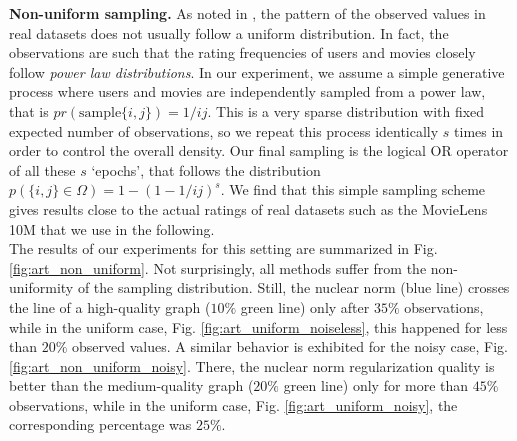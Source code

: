 \documentclass{article}
\begin{document}
{\bf Non-uniform sampling. } 
As noted in \cite{salakhutdinov2010collaborative}, the pattern of the observed values in real datasets does not usually follow a uniform distribution. In fact, the observations are such that the rating frequencies of users and movies closely follow \textit{power law distributions}. 
In our experiment, we assume a simple generative process where users and movies are independently sampled from a power law, that is $pr\left(\textrm{sample} \{i,j\}\right) = 1/ ij$. This is a very sparse distribution with fixed expected number of observations, so we repeat this process identically $s$ times in order to control the overall density. Our final sampling is the logical OR operator of all these $s$ `epochs', that follows the distribution
$p\left(\{i,j\} \in \Omega\right) = 1 - \left(1 - 1/ij\right)^s. $
We find that this simple sampling scheme gives results close to the actual ratings of real datasets such as the MovieLens 10M that we use in the following.\\
The results of our experiments for this setting are summarized in Fig. \ref{fig:art_non_uniform}. Not surprisingly, all methods suffer from the non-uniformity of the sampling distribution. Still, the nuclear norm (blue line) crosses the line of a high-quality graph ($10\%$ green line) only after $35\%$ observations, while in the uniform case, Fig. \ref{fig:art_uniform_noiseless}, this happened for less than $20\%$ observed values. A similar behavior is exhibited for the noisy case, Fig. \ref{fig:art_non_uniform_noisy}. There, the nuclear norm regularization quality is better than the medium-quality graph ($20\%$ green line) only for more than $45\%$ observations, while in the uniform case, Fig. \ref{fig:art_uniform_noisy}, the corresponding percentage was $25\%$. 
\end{document}
